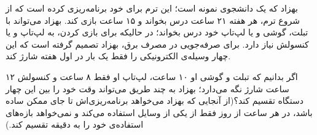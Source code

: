     \p
    بهزاد که یک دانشجوی نمونه است؛ این ترم برای خود برنامه‌ریزی کرده است که از شروع ترم، هر هفته ۲۱ ساعت درس بخواند و ۱۵ ساعت بازی کند. بهزاد می‌تواند با تبلت، گوشی و یا لپ‌تاپ خود درس بخواند؛ در حالیکه برای بازی کردن، به لپ‌تاپ و یا کنسولش نیاز دارد. برای صرفه‌جویی در مصرف برق، بهزاد تصمیم گرفته است که این چهار وسیله‌ی الکترونیکی را فقط یک بار در اول هفته شارژ کند.
    
    \p
    اگر بدانیم که تبلت و گوشی او ۱۰ ساعت، لپ‌تاپ او فقط ۸ ساعت و کنسولش ۱۲ ساعت شارژ نگه می‌دارد؛ بهزاد به چند طریق می‌تواند وقت خود را بین این چهار دستگاه تقسیم کند؟(از آنجایی که بهزاد می‌خواهد برنامه‌ریزی‌اش تا جای
ممکن ساده باشد، در هر ساعت از روز فقط از یکی از وسایل استفاده می‌کند و نمی‌خواهد بازه‌های استفاده‌ی خود را به دقیقه تقسیم کند.)
